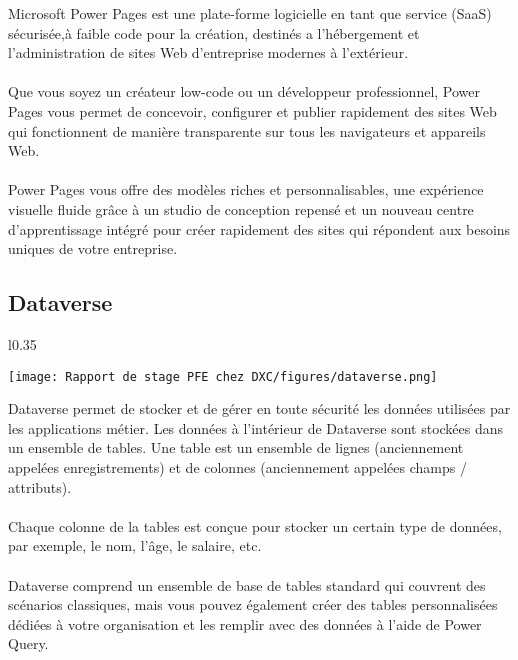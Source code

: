 Microsoft Power Pages est une plate-forme logicielle en tant que service (SaaS) sécurisée,à faible code pour la création, destinés a l'hébergement et l'administration de sites Web d'entreprise modernes à l'extérieur. 
\\\\
Que vous soyez un créateur low-code ou un développeur professionnel, Power Pages vous permet de concevoir, configurer et publier rapidement des sites Web qui fonctionnent de manière transparente sur tous les navigateurs et appareils Web.
\\\\
Power Pages vous offre des modèles riches et personnalisables, une expérience visuelle fluide grâce à un studio de conception repensé et un nouveau centre d'apprentissage intégré pour créer rapidement des sites qui répondent aux besoins uniques de votre entreprise.

\subsection{Dataverse }

\begin{wrapfigure}{l}{0.35\textwidth}
  \begin{center}
    \texttt{[image: Rapport de stage PFE chez DXC/figures/dataverse.png]}
  \end{center}
\end{wrapfigure}

Dataverse permet de stocker et de gérer en toute sécurité les données utilisées par les applications métier. Les données à l’intérieur de Dataverse sont stockées dans un ensemble de tables. Une table est un ensemble de lignes (anciennement appelées enregistrements) et de colonnes (anciennement appelées champs / attributs). 
\\\\
Chaque colonne de la tables est conçue pour stocker un certain type de données, par exemple, le nom, l’âge, le salaire, etc. 
\\\\
Dataverse comprend un ensemble de base de tables standard qui couvrent des scénarios classiques, mais vous pouvez également créer des tables personnalisées dédiées à votre organisation et les remplir avec des données à l’aide de Power Query. 




